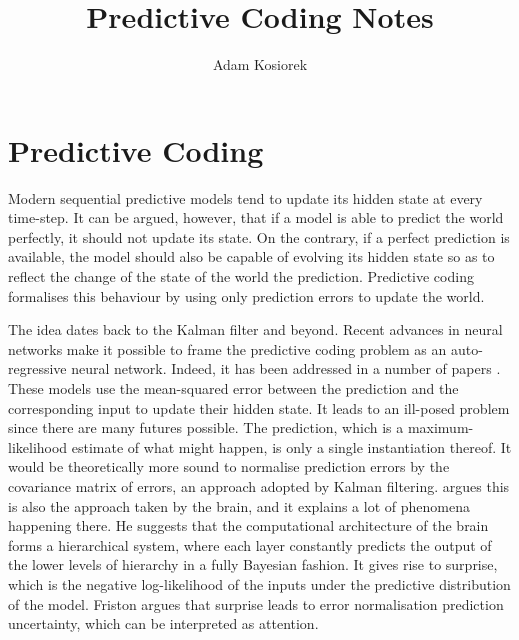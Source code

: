 \documentclass[]{article}
\title{Predictive Coding Notes}
\author{Adam Kosiorek}
\begin{document}
\maketitle

%

%	
%	
%	
\section{Predictive Coding}

	Modern sequential predictive models tend to update its hidden state at every time-step. It can be argued, however, that if a model is able to predict the world perfectly, it should not update its state. On the contrary, if a perfect prediction is available, the model should also be capable of evolving its hidden state so as to reflect the change of the state of the world \wrt the prediction. Predictive coding formalises this behaviour by using only prediction errors to update the world. 
	
	The idea dates back to the Kalman filter and beyond\addref. Recent advances in neural networks make it possible to frame the predictive coding problem as an auto-regressive neural network. Indeed, it has been addressed in a number of papers \citep{Lotter2016, Canziani2017}. These models use the mean-squared error between the prediction and the corresponding input to update their hidden state. It leads to an ill-posed problem since there are many futures possible. The prediction, which is a maximum-likelihood estimate of what might happen, is only a single instantiation thereof. It would be theoretically more sound to normalise prediction errors by the covariance matrix of errors, an approach adopted by Kalman filtering. \cite{Friston2009} argues this is also the approach taken by the brain, and it explains a lot of phenomena happening there. He suggests that the computational architecture of the brain forms a hierarchical system, where each layer constantly predicts the output of the lower levels of hierarchy in a fully Bayesian fashion. It gives rise to surprise, which is the negative log-likelihood of the inputs under the predictive distribution of the model. Friston argues that surprise leads to error normalisation \wrt prediction uncertainty, which can be interpreted as attention.
	
\end{document}
